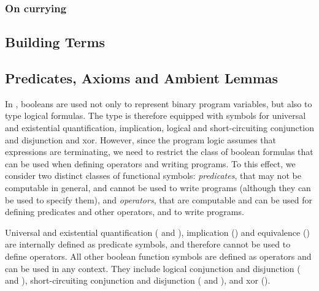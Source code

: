 \subsubsection*{On currying}

\subsection{Building Terms}

\subsection{Predicates, Axioms and Ambient Lemmas\label{sec:ec-specifics}}
In \EasyCrypt, booleans are used not only to represent binary program variables, but
also to type logical formulas. The  type is therefore equipped with
symbols for universal and existential quantification, implication, logical and
short-circuiting conjunction and disjunction and xor. However, since the program
logic assumes that expressions are terminating, we need to restrict the class of
boolean formulas that can be used when defining operators and writing programs.
To this effect, we consider two distinct classes of functional symbols:
\emph{predicates}, that may not be computable in general, and cannot be used to
write programs (although they can be used to specify them), and
\emph{operators}, that are computable and can be used for defining predicates
and other operators, and to write programs.

Universal and existential quantification ( and ),
implication (\rawec{=>}) and equivalence (\rawec{<=>}) are internally defined as
predicate symbols, and therefore cannot be used to define operators. All other
boolean function symbols are defined as operators and can be used in any
context. They include logical conjunction and disjunction (\rawec{/\\} and
\rawec{\\\/}), short-circuiting conjunction and disjunction (\rawec{\&\&} and
\rawec{\|\|}), and xor (\rawec{\^\^}).


